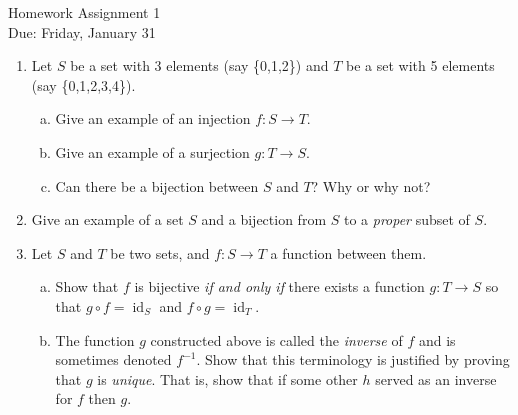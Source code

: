 \documentclass[11pt]{article}
\begin{document}
\begin{center}
\Large {Homework Assignment 1}\\
\small {Due: Friday, January 31}
\end{center}
\begin{enumerate}
\item Let $S$ be a set with 3 elements (say \{0,1,2\}) and $T$ be a set with 5 elements (say \{0,1,2,3,4\}).
\begin{enumerate}[(a)]
\item Give an example of an injection $f:S\to T$.
\item Give an example of a surjection $g:T\to S$.
\item Can there be a bijection between $S$ and $T$? Why or why not?
\end{enumerate}
\item Give an example of a set $S$ and a bijection from $S$ to a \emph{proper} subset of $S$.
\item Let $S$ and $T$ be two sets, and $f:S\to T$ a function between them.
\begin{enumerate}[(a)]
\item Show that $f$ is bijective \textit{if and only if} there exists a function $g:T\to S$ so that $g\circ f = \operatorname{id}_S$ and $f\circ g=\operatorname{id}_T$.

\item The function $g$ constructed above is called the \emph{inverse} of $f$ and is sometimes denoted $f^{-1}$.  Show that this terminology is justified by proving that $g$ is \textit{unique}.  That is, show that if some other $h$ served as an inverse for $f$ then $g$.


\end{enumerate}
\end{enumerate}
\end{document}
